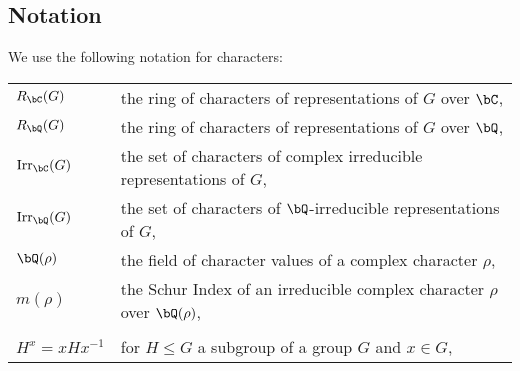 

\subsection*{Notation}
We use the following notation for characters:

\bigskip

\begin{tabular}{l | l}
    $R_{\bC}(G)$ & the ring of characters of representations of $G$ over $\bC$, \\
    $R_{\bQ}(G)$ & the ring of characters of representations of $G$ over $\bQ$, \\
    $\Irr_\bC(G)$ & the set of characters of complex irreducible representations of $G$, \\
    $\Irr_{\bQ}(G)$ & the set of characters of $\bQ$-irreducible representations of $G$, \\ 
    $\bQ(\rho)$ & the field of character values of a complex character $\rho$, \\
    $m(\rho)$ & the Schur Index of an irreducible complex character $\rho$ over $\bQ(\rho)$, \\
    \\
    $H^{x} = xHx^{-1}$ & for $H \leq G$ a subgroup of a group $G$ and $x \in G$,
\end{tabular}